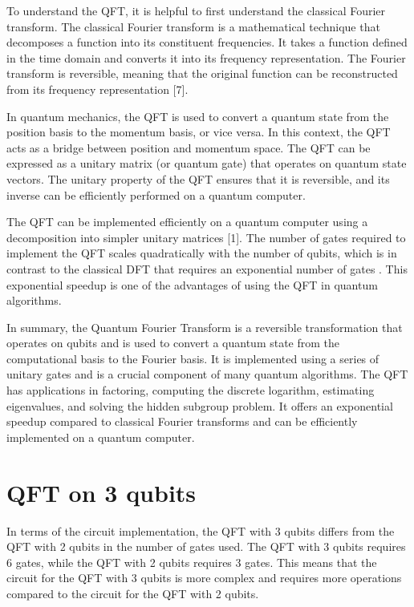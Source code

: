 \documentclass[inscr,ack,preface]{diphdthesis}
\begin{document}
To understand the QFT, it is helpful to first understand the classical Fourier transform. The classical Fourier transform is a mathematical technique that decomposes a function into its constituent frequencies. It takes a function defined in the time domain and converts it into its frequency representation. The Fourier transform is reversible, meaning that the original function can be reconstructed from its frequency representation [7].

In quantum mechanics, the QFT is used to convert a quantum state from the position basis to the momentum basis, or vice versa. In this context, the QFT acts as a bridge between position and momentum space. The QFT can be expressed as a unitary matrix (or quantum gate) that operates on quantum state vectors. The unitary property of the QFT ensures that it is reversible, and its inverse can be efficiently performed on a quantum computer.

The QFT can be implemented efficiently on a quantum computer using a decomposition into simpler unitary matrices [1]. The number of gates required to implement the QFT scales quadratically with the number of qubits, which is in contrast to the classical DFT that requires an exponential number of gates . This exponential speedup is one of the advantages of using the QFT in quantum algorithms.

In summary, the Quantum Fourier Transform is a reversible transformation that operates on qubits and is used to convert a quantum state from the computational basis to the Fourier basis. It is implemented using a series of unitary gates and is a crucial component of many quantum algorithms. The QFT has applications in factoring, computing the discrete logarithm, estimating eigenvalues, and solving the hidden subgroup problem. It offers an exponential speedup compared to classical Fourier transforms and can be efficiently implemented on a quantum computer.

\section{QFT on 3 qubits}

In terms of the circuit implementation, the QFT with 3 qubits differs from the QFT with 2 qubits in the number of gates used. The QFT with 3 qubits requires 6 gates, while the QFT with 2 qubits requires 3 gates. This means that the circuit for the QFT with 3 qubits is more complex and requires more operations compared to the circuit for the QFT with 2 qubits.
\end{document}
